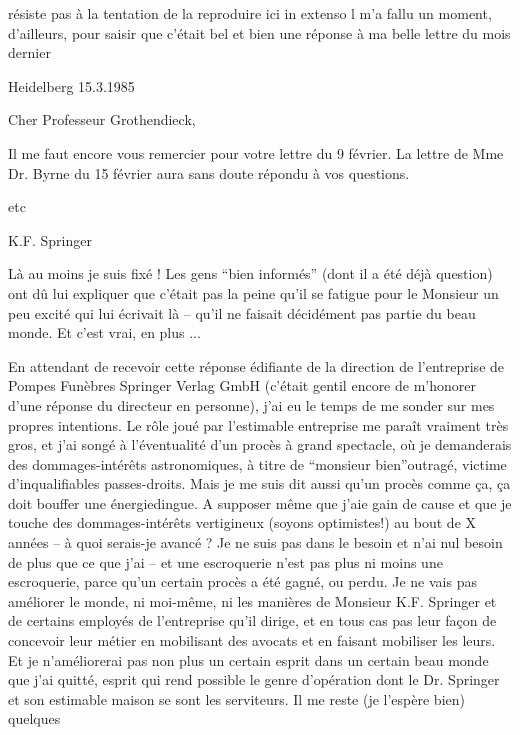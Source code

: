 résiste pas à la tentation de la reproduire ici in extenso\deleted{\unsure{--}} l m'a fallu un moment, d'ailleurs, pour saisir que c'était bel et bien une réponse à ma belle lettre  du mois dernier\deleted{\unsure{;}}

\begin{flushright}Heidelberg 15.3.1985\end{flushright}
Cher Professeur Grothendieck,

Il me faut encore vous remercier pour votre lettre du 9 février. La lettre de Mme Dr. Byrne du 15 février aura sans doute répondu à vos questions.

 etc
\begin{flushright}K.F. Springer\end{flushright}

Là au moins je suis fixé ! Les gens ``bien informés'' (dont il a été déjà question) ont dû lui expliquer que c'était pas la peine qu'il se fatigue pour le Monsieur un peu excité qui lui écrivait là -- qu'il ne faisait décidément pas partie du beau monde. Et c'est vrai, en plus ...

En attendant de recevoir cette réponse édifiante de la direction de l'entreprise de Pompes Funèbres Springer Verlag GmbH (c'était gentil encore de m'honorer d'une réponse  du directeur en personne), j'ai eu le temps de me sonder sur mes propres intentions. Le rôle joué par l'estimable entreprise me paraît vraiment très gros, et j'ai songé à l'éventualité d'un procès à grand spectacle, où je demanderais des dommages-intérêts astronomiques, à titre de ``monsieur bien''\inserted{ }outragé,  victime d'inqualifiables passes-droits. Mais je me suis dit aussi  qu'un procès comme ça, ça doit bouffer une énergie\inserted{ }dingue. A supposer même que j'aie gain de cause et que je touche des dommages-intérêts vertigineux (soyons optimistes!)\inserted{,} au bout de X années\deleted{,} -- à quoi serais-je avancé ? Je ne suis pas dans le besoin et n'ai nul besoin de plus que ce que j'ai -- et une escroquerie n'est pas plus ni moins une escroquerie, parce qu'un certain procès a été gagné, ou perdu. Je ne vais pas améliorer le monde, ni moi-même, ni les manières de Monsieur K.F. Springer et de certains employés de l'entreprise qu'il dirige, et en tous cas pas leur façon de concevoir leur métier\inserted{,} en mobilisant des avocats et en  faisant mobiliser les leurs\inserted{(*)}.  Et je n'améliorerai pas non plus un certain esprit dans un certain beau monde que j'ai quitté,  esprit qui rend possible le genre d'opération dont le Dr. Springer et son estimable  maison se sont les serviteurs. Il me reste (je l'espère bien) quelques
